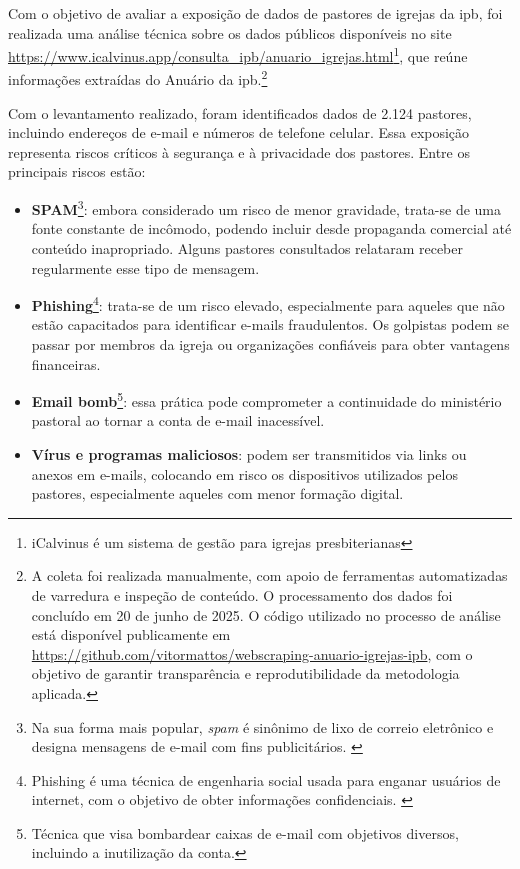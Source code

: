 Com o objetivo de avaliar a exposição de dados de pastores de igrejas da \gls{ipb}, foi realizada uma análise técnica sobre os dados públicos disponíveis no site \url{https://www.icalvinus.app/consulta_ipb/anuario_igrejas.html}\footnote{iCalvinus é um sistema de gestão para igrejas presbiterianas}, que reúne informações extraídas do Anuário da \gls{ipb}.\footnote{A coleta foi realizada manualmente, com apoio de ferramentas automatizadas de varredura e inspeção de conteúdo. O processamento dos dados foi concluído em 20 de junho de 2025. O código utilizado no processo de análise está disponível publicamente em \url{https://github.com/vitormattos/webscraping-anuario-igrejas-ipb}, com o objetivo de garantir transparência e reprodutibilidade da metodologia aplicada.}

Com o levantamento realizado, foram identificados dados de 2.124 pastores, incluindo endereços de e-mail e números de telefone celular. Essa exposição representa riscos críticos à segurança e à privacidade dos pastores. Entre os principais riscos estão:

\begin{itemize}
    \item \textbf{SPAM}\footnote{Na sua forma mais popular, \textit{spam} é sinônimo de lixo de correio eletrônico e designa mensagens de e-mail com fins publicitários. \cite{wiki_spam}}: embora considerado um risco de menor gravidade, trata-se de uma fonte constante de incômodo, podendo incluir desde propaganda comercial até conteúdo inapropriado. Alguns pastores consultados relataram receber regularmente esse tipo de mensagem.
    
    \item \textbf{Phishing}\footnote{Phishing é uma técnica de engenharia social usada para enganar usuários de internet, com o objetivo de obter informações confidenciais. \cite{wiki_phishing}}: trata-se de um risco elevado, especialmente para aqueles que não estão capacitados para identificar e-mails fraudulentos. Os golpistas podem se passar por membros da igreja ou organizações confiáveis para obter vantagens financeiras.
    
    \item \textbf{Email bomb}\footnote{Técnica que visa bombardear caixas de e-mail com objetivos diversos, incluindo a inutilização da conta.\cite{wiki_emailbomb}}: essa prática pode comprometer a continuidade do ministério pastoral ao tornar a conta de e-mail inacessível.
    
    \item \textbf{Vírus e programas maliciosos}: podem ser transmitidos via links ou anexos em e-mails, colocando em risco os dispositivos utilizados pelos pastores, especialmente aqueles com menor formação digital.
\end{itemize}

